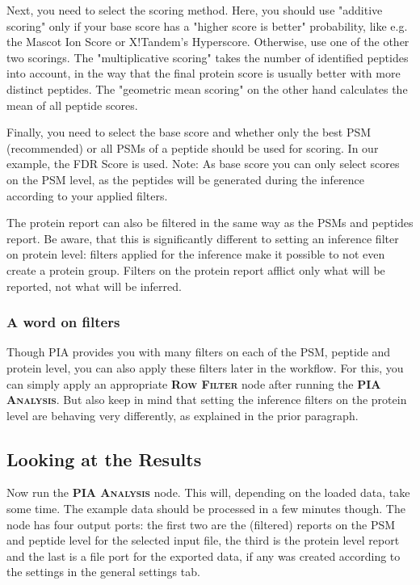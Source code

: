 \documentclass[a4paper,11pt,twoside]{article}
\newcommand{\knimenode}[1]{{\scshape\bfseries #1}}
\begin{document}
Next, you need to select the scoring method. Here, you should use "additive
scoring" only if your base score has a "higher score is better" probability,
like e.g. the Mascot Ion Score or X!Tandem's Hyperscore. Otherwise, use one of
the other two scorings. The "multiplicative scoring" takes the number of
identified peptides into account, in the way that the final protein score is
usually better with more distinct peptides. The "geometric mean scoring" on the
other hand calculates the mean of all peptide scores.

Finally, you need to select the base score and whether only the best PSM
(recommended) or all PSMs of a peptide should be used for scoring. In our
example, the FDR Score is used. Note: As base score you can only
select scores on the PSM level, as the peptides will be generated during the
inference according to your applied filters.

The protein report can also be filtered in the same way as the PSMs and
peptides report. Be aware, that this is significantly different to setting an
inference filter on protein level: filters applied for the inference make it
possible to not even create a protein group. Filters on the protein report
afflict only what will be reported, not what will be inferred.


\subsubsection{A word on filters}

Though PIA provides you with many filters on each of the PSM, peptide and
protein level, you can also apply these filters later in the workflow. For
this, you can simply apply an appropriate \knimenode{Row Filter} node after
running the \knimenode{PIA Analysis}. But also keep in mind that setting the
inference filters on the protein level are behaving very differently, as
explained in the prior paragraph.


\subsection{Looking at the Results}

Now run the \knimenode{PIA Analysis} node. This will, depending on the loaded
data, take some time. The example data should be processed in a few minutes
though. The node has four output ports: the first two are the (filtered)
reports on the PSM and peptide level for the selected input file, the third is
the protein level report and the last is a file port for the exported data, if
any was created according to the settings in the general settings tab.
\end{document}
